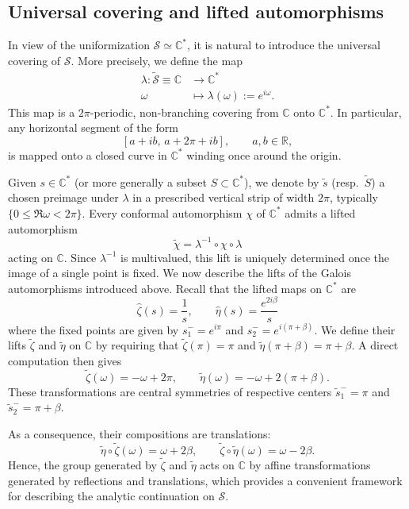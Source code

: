 \documentclass[11pt]{article}
\theoremstyle{definition}
\renewcommand{\leq}{\leqslant}
\begin{document}
\subsection{Universal covering and lifted automorphisms}

In view of the uniformization $\mathcal S \simeq \mathbb{C}^*$, it is natural to introduce the universal covering of $\mathcal S $.
More precisely, we define the map
\[
\begin{aligned}
\lambda:\widetilde{\mathcal S}\equiv\mathbb{C}&\longrightarrow \mathbb{C}^*\\
\omega&\longmapsto \lambda(\omega):=e^{i\omega}.
\end{aligned}
\]
This map is a $2\pi$-periodic, non-branching covering from $\mathbb{C}$ onto $\mathbb{C}^*$.
In particular, any horizontal segment of the form
\[
[a+ib,\,a+2\pi+ib],\qquad a,b\in\mathbb{R},
\]
is mapped onto a closed curve in $\mathbb{C}^*$ winding once around the origin.

Given $s\in\mathbb{C}^*$ (or more generally a subset $S\subset\mathbb{C}^*$), we denote by $\widetilde{s}$ (resp.\ $\widetilde{S}$) a chosen preimage under $\lambda$ in a prescribed vertical strip of width $2\pi$, typically $\{0\leq \Re\omega<2\pi\}$.
Every conformal automorphism $\chi$ of $\mathbb{C}^*$ admits a lifted automorphism
\[
\widetilde{\chi}=\lambda^{-1}\circ\chi\circ\lambda
\]
acting on $\mathbb{C}$.
Since $\lambda^{-1}$ is multivalued, this lift is uniquely determined once the image of a single point is fixed.
We now describe the lifts of the Galois automorphisms introduced above.
Recall that the lifted maps on $\mathbb{C}^*$ are
\[
\widehat\zeta(s)=\frac{1}{s},
\qquad
\widehat\eta(s)=\frac{e^{2i\beta}}{s}
\]
where the fixed points are given by 
$
s_1^-=e^{i\pi}$ and $s_2^-=e^{i(\pi+\beta)}$.
We define their lifts $\widetilde\zeta$ and $\widetilde\eta$ on $\mathbb{C}$ by requiring that
$\widetilde\zeta(\pi)=\pi$ and
$\widetilde\eta(\pi+\beta)=\pi+\beta$.
A direct computation then gives
\[
\widetilde\zeta(\omega)=-\omega+2\pi,
\qquad
\widetilde\eta(\omega)=-\omega+2(\pi+\beta).
\]
These transformations are central symmetries of respective centers $\widetilde{s}_1^-=\pi$ and $\widetilde{s}_2^-=\pi+\beta$.

As a consequence, their compositions are translations:
\[
\widetilde\eta\circ\widetilde\zeta(\omega)=\omega+2\beta,
\qquad
\widetilde\zeta\circ\widetilde\eta(\omega)=\omega-2\beta.
\]
Hence, the group generated by $\widetilde\zeta$ and $\widetilde\eta$ acts on $\mathbb{C}$ by affine transformations generated by reflections and translations, which provides a convenient framework for describing the analytic continuation on $\mathcal S$.
\end{document}
